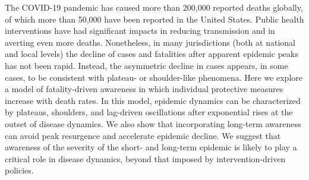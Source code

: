 The COVID-19 pandemic has caused more than 200,000 reported deaths
globally, of which more than 50,000 have been reported
in the United States. Public health interventions
have had significant impacts in reducing transmission and in
averting even more deaths. Nonetheless, in many jurisdictions
(both at national and local levels) the decline of cases and fatalities
after apparent epidemic peaks has not been rapid.  Instead, the asymmetric
decline in cases appears, in some cases, to be consistent
with plateau- or shoulder-like phenomena.  
Here we explore a model of fatality-driven
awareness in which individual protective measures increase
with death rates.  In this model, epidemic dynamics
can be characterized by plateaus, shoulders,
and lag-driven oscillations after exponential rises
at the outset of disease dynamics. We also show that
incorporating long-term awareness can avoid peak resurgence and accelerate
epidemic decline.  We suggest that awareness of the severity of the short- and long-term epidemic is likely to play a critical
role in disease dynamics, beyond that imposed by intervention-driven policies.
